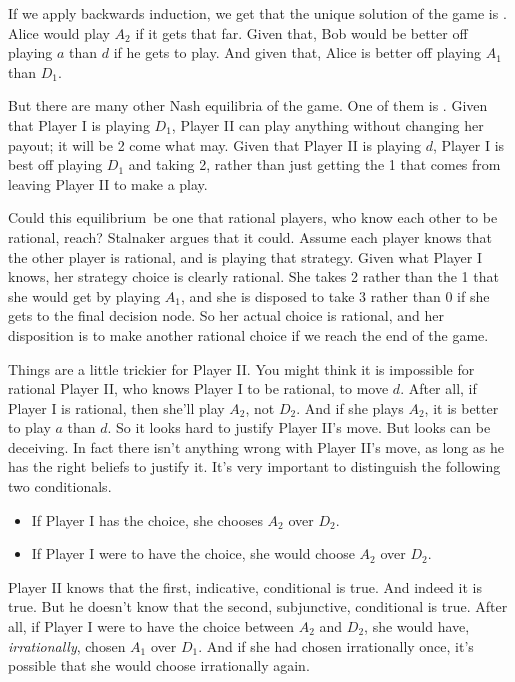 \documentclass[openany]{book}
\newcommand{\eqm}{equilibrium}
\begin{document}
If we apply backwards induction, we get that the unique solution of the game is . Alice would play $A_2$ if it gets that far. Given that, Bob would be better off playing $a$ than $d$ if he gets to play. And given that, Alice is better off playing $A_1$ than $D_1$.

But there are many other Nash equilibria of the game. One of them is . Given that Player I is playing $D_1$, Player II can play anything without changing her payout; it will be 2 come what may. Given that Player II is playing $d$, Player I is best off playing $D_1$ and taking 2, rather than just getting the 1 that comes from leaving Player II to make a play.

Could this \eqm\ be one that rational players, who know each other to be rational, reach? Stalnaker argues that it could. Assume each player knows that the other player is rational, and is playing that strategy. Given what Player I knows, her strategy choice is clearly rational. She takes 2 rather than the 1 that she would get by playing $A_1$, and she is disposed to take 3 rather than 0 if she gets to the final decision node. So her actual choice is rational, and her disposition is to make another rational choice if we reach the end of the game.

Things are a little trickier for Player II. You might think it is impossible for rational Player II, who knows Player I to be rational, to move $d$. After all, if Player I is rational, then she'll play $A_2$, not $D_2$. And if she plays $A_2$, it is better to play $a$ than $d$. So it looks hard to justify Player II's move. But looks can be deceiving. In fact there isn't anything wrong with Player II's move, as long as he has the right beliefs to justify it. It's very important to distinguish the following two conditionals.

\begin{itemize}
\item If Player I has the choice, she chooses $A_2$ over $D_2$.
\item If Player I were to have the choice, she would choose $A_2$ over $D_2$.
\end{itemize}

\noindent Player II knows that the first, indicative, conditional is true. And indeed it is true. But he doesn't know that the second, subjunctive, conditional is true. After all, if Player I were to have the choice between $A_2$ and $D_2$, she would have, \textit{irrationally}, chosen $A_1$ over $D_1$. And if she had chosen irrationally once, it's possible that she would choose irrationally again.
\end{document}
